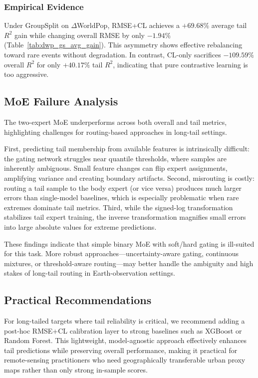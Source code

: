 \documentclass[preprint,12pt]{elsarticle}
\begin{document}
\subsubsection{Empirical Evidence}
Under GroupSplit on $\Delta$WorldPop, RMSE+CL achieves a $+69.68\%$ average tail $R^2$ gain while changing overall RMSE by only $-1.94\%$ (Table~\ref{tab:dwp_gs_avg_gain}). This asymmetry shows effective rebalancing toward rare events without degradation. In contrast, CL-only sacrifices $-109.59\%$ overall $R^2$ for only $+40.17\%$ tail $R^2$, indicating that pure contrastive learning is too aggressive.

\subsection{MoE Failure Analysis}

The two-expert MoE underperforms across both overall and tail metrics, highlighting challenges for routing-based approaches in long-tail settings.

First, predicting tail membership from available features is intrinsically difficult: the gating network struggles near quantile thresholds, where samples are inherently ambiguous. Small feature changes can flip expert assignments, amplifying variance and creating boundary artifacts. Second, misrouting is costly: routing a tail sample to the body expert (or vice versa) produces much larger errors than single-model baselines, which is especially problematic when rare extremes dominate tail metrics. Third, while the signed-log transformation stabilizes tail expert training, the inverse transformation magnifies small errors into large absolute values for extreme predictions.

These findings indicate that simple binary MoE with soft/hard gating is ill-suited for this task. More robust approaches---uncertainty-aware gating, continuous mixtures, or threshold-aware routing---may better handle the ambiguity and high stakes of long-tail routing in Earth-observation settings.

\subsection{Practical Recommendations}

For long-tailed targets where tail reliability is critical, we recommend adding a post-hoc RMSE+CL calibration layer to strong baselines such as XGBoost or Random Forest. This lightweight, model-agnostic approach effectively enhances tail predictions while preserving overall performance, making it practical for remote-sensing practitioners who need geographically transferable urban proxy maps rather than only strong in-sample scores.
\end{document}
